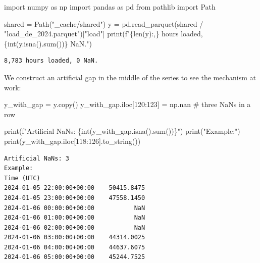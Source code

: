 \documentclass[
  english,
  letterpaper,
]{scrbook}
\newenvironment{Shaded}{\begin{snugshade}}{\end{snugshade}}
\newcommand{\BuiltInTok}[1]{\textcolor[rgb]{0.00,0.23,0.31}{#1}}
\newcommand{\CommentTok}[1]{\textcolor[rgb]{0.37,0.37,0.37}{#1}}
\newcommand{\DecValTok}[1]{\textcolor[rgb]{0.68,0.00,0.00}{#1}}
\newcommand{\ImportTok}[1]{\textcolor[rgb]{0.00,0.46,0.62}{#1}}
\newcommand{\NormalTok}[1]{\textcolor[rgb]{0.00,0.23,0.31}{#1}}
\newcommand{\OperatorTok}[1]{\textcolor[rgb]{0.37,0.37,0.37}{#1}}
\newcommand{\SpecialCharTok}[1]{\textcolor[rgb]{0.37,0.37,0.37}{#1}}
\newcommand{\SpecialStringTok}[1]{\textcolor[rgb]{0.13,0.47,0.30}{#1}}
\newcommand{\StringTok}[1]{\textcolor[rgb]{0.13,0.47,0.30}{#1}}
\begin{document}
\protect{}\label{load-y}
\begin{Shaded}
\begin{Highlighting}[]
\ImportTok{import}\NormalTok{ numpy }\ImportTok{as}\NormalTok{ np}
\ImportTok{import}\NormalTok{ pandas }\ImportTok{as}\NormalTok{ pd}
\ImportTok{from}\NormalTok{ pathlib }\ImportTok{import}\NormalTok{ Path}

\NormalTok{shared }\OperatorTok{=}\NormalTok{ Path(}\StringTok{"\_cache/shared"}\NormalTok{)}
\NormalTok{y }\OperatorTok{=}\NormalTok{ pd.read\_parquet(shared }\OperatorTok{/} \StringTok{"load\_de\_2024.parquet"}\NormalTok{)[}\StringTok{"load"}\NormalTok{]}
\BuiltInTok{print}\NormalTok{(}\SpecialStringTok{f"}\SpecialCharTok{\{}\BuiltInTok{len}\NormalTok{(y)}\SpecialCharTok{:,\}}\SpecialStringTok{ hours loaded, }\SpecialCharTok{\{}\BuiltInTok{int}\NormalTok{(y.isna().}\BuiltInTok{sum}\NormalTok{())}\SpecialCharTok{\}}\SpecialStringTok{ NaN."}\NormalTok{)}
\end{Highlighting}
\end{Shaded}

\begin{verbatim}
8,783 hours loaded, 0 NaN.
\end{verbatim}

We construct an artificial gap in the middle of the series to see the
mechanism at work:

\protect{}\label{insert-gap}
\begin{Shaded}
\begin{Highlighting}[]
\NormalTok{y\_with\_gap }\OperatorTok{=}\NormalTok{ y.copy()}
\NormalTok{y\_with\_gap.iloc[}\DecValTok{120}\NormalTok{:}\DecValTok{123}\NormalTok{] }\OperatorTok{=}\NormalTok{ np.nan        }\CommentTok{\# three NaNs in a row}

\BuiltInTok{print}\NormalTok{(}\SpecialStringTok{f"Artificial NaNs: }\SpecialCharTok{\{}\BuiltInTok{int}\NormalTok{(y\_with\_gap.isna().}\BuiltInTok{sum}\NormalTok{())}\SpecialCharTok{\}}\SpecialStringTok{"}\NormalTok{)}
\BuiltInTok{print}\NormalTok{(}\StringTok{"Example:"}\NormalTok{)}
\BuiltInTok{print}\NormalTok{(y\_with\_gap.iloc[}\DecValTok{118}\NormalTok{:}\DecValTok{126}\NormalTok{].to\_string())}
\end{Highlighting}
\end{Shaded}

\begin{verbatim}
Artificial NaNs: 3
Example:
Time (UTC)
2024-01-05 22:00:00+00:00    50415.8475
2024-01-05 23:00:00+00:00    47558.1450
2024-01-06 00:00:00+00:00           NaN
2024-01-06 01:00:00+00:00           NaN
2024-01-06 02:00:00+00:00           NaN
2024-01-06 03:00:00+00:00    44314.0025
2024-01-06 04:00:00+00:00    44637.6075
2024-01-06 05:00:00+00:00    45244.7525
\end{verbatim}
\end{document}
